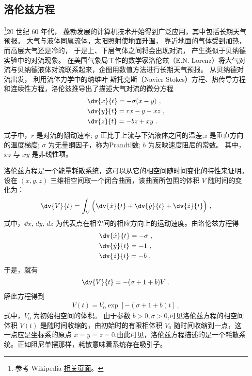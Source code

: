 

\subsection{洛伦兹方程}

\footnote{参考 Wikipedia \href{https://en.wikipedia.org/wiki/Lorenz_system}{相关页面}。}20 世纪 60 年代， 蓬勃发展的计算机技术开始得到广泛应用，其中包括长期天气预报。 大气与液体同属流体，太阳照射使地面升温， 靠近地面的气体受到加热， 而高层大气还是冷的， 于是上、下层气体之间将会出现对流， 产生类似于贝纳德实验中的对流现象。 在美国气象局工作的数学家洛伦兹（E.N. Lorenz）将大气对流与贝纳德液体对流联系起来，企图用数值方法进行长期天气预报。 从贝纳德对流出发， 利用流体力学中的纳维叶-斯托克斯（Navier-Stokes）方程、热传导方程和连续性方程，洛伦兹推导出了描述大气对流的微分方程
\begin{align}
&\dv{x}{t}=-\sigma (x-y)~,\\
&\dv{y}{t}=rx-y-xz~,\\
&\dv{z}{t}=-bz+xy~.
\end{align}
式子中，$r$ 是对流的翻动速率; $y$ 正比于上流与下流液体之间的温差;$z$ 是垂直方向的温度梯度; $\sigma$ 为无量纲因子，称为Prandtl数; $b$ 为反映速度阻尼的常数。 其中，$xz$ 与 $xy$ 是非线性项。

洛伦兹方程是一个能量耗散系统，这可以从它的相空间随时间变化的特性来证明。设在 $(x,y, z)$ 三维相空间取一个闭合曲面，该曲面所包围的体积 $V$ 随时间的变化为：
\begin{align}
\dv{V}{t}=\int_V \Big(\dv{\dot{x}}{t}+\dv{\dot{y}}{t}+\dv{\dot{z}}{t}\Big)~,
\end{align}
式中，$\dd{\dot{x}}$, $d\dot{y}$, $d\dot{z}$ 为代表点在相空间的相应方向上的运动速度。由洛伦兹方程得
\begin{align}
&\dv{\dot{x}}{t}=-\sigma~,\\
&\dv{\dot{y}}{t}=-1~,\\
&\dv{\dot{z}}{t}=-b~,
\end{align}
于是，就有
\begin{align}
\dv{V}{t}=-(\sigma+1+b)V~.
\end{align}
解此方程得到
\begin{align}
V(t)=V_0\exp[-(\sigma+1+b)t]~,
\end{align}
式中，$V_0$ 为初始相空间的体积。 由于参数 $b>0,\sigma>0$,可见洛伦兹方程的相空间体积 $V(t)$ 是随时间收缩的，由初始时的有限相体积 $V_0$ 随时间收缩到一点，这一点应是坐标系的原点 $x=y=z=0$.由此可见，洛伦兹方程描述的是一个耗散系统。正如阻尼单摆那样，耗散意味着系统存在吸引子。

